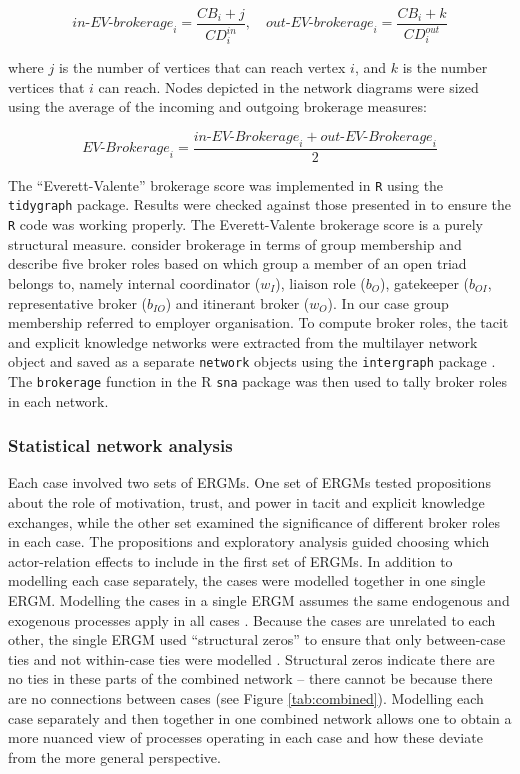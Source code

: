 $$\textit{in-EV-brokerage}_i = \frac{CB_i + j}{CD_i^{in}},  \,\,\,\,\,\, \textit{out-EV-brokerage}_i = \frac{CB_i + k}{CD_i^{out}} $$ \medskip

\noindent where $j$ is the number of vertices that can reach vertex $i$, and $k$ is the number vertices that $i$ can reach. Nodes depicted in the network diagrams were sized using the average of the incoming and outgoing brokerage measures: \medskip

$$ \textit{EV-Brokerage}_i = \frac{\textit{in-EV-Brokerage}_i + \textit{out-EV-Brokerage}_i}{2} $$ \medskip

The \enquote{Everett-Valente} brokerage score was implemented in \texttt{R} using the \texttt{tidygraph} package. Results were checked against those presented in \citet{everett2016bridging} to ensure the \texttt{R} code was working properly. The Everett-Valente brokerage score is a purely structural measure. \citet{gould1989structures} consider brokerage in terms of group membership and describe five broker roles based on which group a member of an open triad belongs to, namely internal coordinator ($w_I$), liaison role ($b_O$), gatekeeper ($b_{OI}$, representative broker ($b_{IO}$) and itinerant broker ($w_O$). In our case group membership referred to employer organisation. To compute \citet{gould1989structures} broker roles, the tacit and explicit knowledge networks were extracted from the multilayer network object and saved as a separate \texttt{network} objects \citep{butts2008network} using the \texttt{intergraph} package \citep{bojanowski2015intergraph}. The \texttt{brokerage} function in the R \texttt{sna} package \citep{butts2016sna} was then used to tally broker roles in each network. 

\subsubsection{Statistical network analysis}

Each case involved two sets of ERGMs. One set of ERGMs tested propositions about the role of motivation, trust, and power in tacit and explicit knowledge exchanges, while the other set examined the significance of different broker roles in each case. The propositions and exploratory analysis guided choosing which actor-relation effects to include in the first set of ERGMs. In addition to modelling each case separately, the cases were modelled together in one single ERGM. Modelling the cases in a single ERGM assumes the same endogenous and exogenous processes apply in all cases \citep{kalish2013brain}. Because the cases are unrelated to each other, the single ERGM used \enquote{structural zeros} to ensure that only between-case ties and not within-case ties were modelled \citep{lusher2012trust}. Structural zeros indicate there are no ties in these parts of the combined network -- there cannot be because there are no connections between cases (see Figure \ref{tab:combined}). Modelling each case separately and then together in one combined network allows one to obtain a more nuanced view of processes operating in each case and how these deviate from the more general perspective. \medskip

